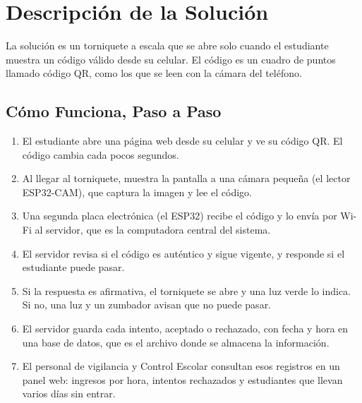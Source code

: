 \section{Descripción de la Solución}
La solución es un torniquete a escala que se abre solo cuando el estudiante
muestra un código válido desde su celular. El código es un cuadro de puntos
llamado código QR, como los que se leen con la cámara del teléfono.

\subsection{Cómo Funciona, Paso a Paso}
\begin{enumerate}
	\item El estudiante abre una página web desde su celular y ve su código QR.
	      El código cambia cada pocos segundos.
	\item Al llegar al torniquete, muestra la pantalla a una cámara pequeña
	      (el lector ESP32-CAM), que captura la imagen y lee el código.
	\item Una segunda placa electrónica (el ESP32) recibe el código y lo envía
	      por Wi-Fi al servidor, que es la computadora central del sistema.
	\item El servidor revisa si el código es auténtico y sigue vigente, y
	      responde si el estudiante puede pasar.
	\item Si la respuesta es afirmativa, el torniquete se abre y una luz verde
	      lo indica. Si no, una luz y un zumbador avisan que no puede pasar.
	\item El servidor guarda cada intento, aceptado o rechazado, con fecha y
	      hora en una base de datos, que es el archivo donde se almacena la
	      información.
	\item El personal de vigilancia y Control Escolar consultan esos registros
	      en un panel web: ingresos por hora, intentos rechazados y estudiantes
	      que llevan varios días sin entrar.
\end{enumerate}

